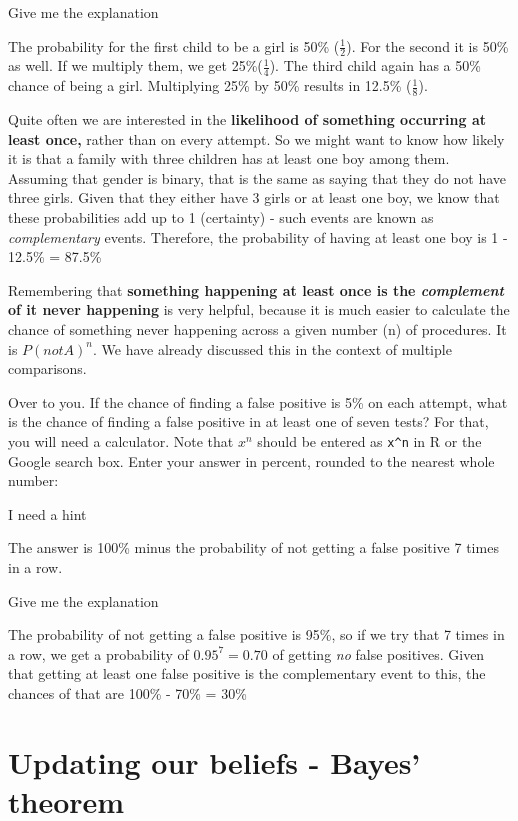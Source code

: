 \documentclass[
]{book}
\begin{document}
Give me the explanation

The probability for the first child to be a girl is 50\% (\(\frac{1}{2}\)). For the second it is 50\% as well. If we multiply them, we get 25\%(\(\frac{1}{4}\)). The third child again has a 50\% chance of being a girl. Multiplying 25\% by 50\% results in 12.5\% (\(\frac{1}{8}\)).

Quite often we are interested in the \textbf{likelihood of something occurring at least once,} rather than on every attempt. So we might want to know how likely it is that a family with three children has at least one boy among them. Assuming that gender is binary, that is the same as saying that they do not have three girls. Given that they either have 3 girls or at least one boy, we know that these probabilities add up to 1 (certainty) - such events are known as \emph{complementary} events. Therefore, the probability of having at least one boy is 1 - 12.5\% = 87.5\%

Remembering that \textbf{something happening at least once is the \emph{complement} of it never happening} is very helpful, because it is much easier to calculate the chance of something never happening across a given number (n) of procedures. It is \(P(notA)^n\). We have already discussed this in the context of multiple comparisons.

Over to you. If the chance of finding a false positive is 5\% on each attempt, what is the chance of finding a false positive in at least one of seven tests? For that, you will need a calculator. Note that \(x^n\) should be entered as \texttt{x\^{}n} in R or the Google search box. Enter your answer in percent, rounded to the nearest whole number:

I need a hint

The answer is 100\% minus the probability of not getting a false positive 7 times in a row.

Give me the explanation

The probability of not getting a false positive is 95\%, so if we try that 7 times in a row, we get a probability of
\(0.95^7=0.70\) of getting \emph{no} false positives. Given that getting at least one false positive is the complementary event to this, the chances of that are 100\% - 70\% = 30\%

\hypertarget{updating-our-beliefs---bayes-theorem}{%
\section{Updating our beliefs - Bayes' theorem}\label{updating-our-beliefs---bayes-theorem}}
\end{document}
